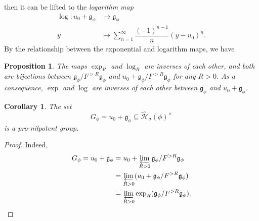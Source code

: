\documentclass[a4paper,12pt]{amsart}
\numberwithin{equation}{section}
\newtheorem{proposition}[theorem]{Proposition}
\newtheorem{corollary}[theorem]{Corollary}
\newcommand{\1}{\mathbf{1}}
\begin{document}
then it can be lifted to the \emph{logarithm map}
\begin{align*}
    \log:u_0+\mathfrak{g}_\phi&\rightarrow \mathfrak{g}_\phi\\
        y&\mapsto\sum_{n=1}^\infty\dfrac{(-1)^{n-1}}{n}(y-u_0)^n.
\end{align*}
By the relationship between the exponential and logarithm maps, we have
\begin{proposition}
    The maps $\exp_R$ and $\log_R$ are inverses of each other, and both are bijections between $\mathfrak{g}_\phi/F^{>R}\mathfrak{g}_\phi$ and $u_0+\mathfrak{g}_\phi/F^{>R}\mathfrak{g}_\phi$ for any $R>0$. As a consequence, $\exp$ and $\log$ are inverses of each other between $\mathfrak{g}_\phi$ and $u_0+\mathfrak{g}_\phi$.
\end{proposition}
\begin{corollary}
    The set
    \[G_\phi=u_0+\mathfrak{g}_\phi\subseteq\hat{\mathcal{H}}_\sigma(\phi)^\times\]
    is a pro-nilpotent group.
\end{corollary}
\begin{proof}
    Indeed,
    \begin{align*}
        G_\phi=u_0+\mathfrak{g}_\phi&=u_0+\varprojlim_{R>0}\mathfrak{g}_\phi/F^{>R}\mathfrak{g}_\phi\\
        &=\varprojlim_{R>0}(u_0+\mathfrak{g}_\phi/F^{>R}\mathfrak{g}_\phi)\\
        &=\varprojlim_{R>0}\exp_R(\mathfrak{g}_\phi/F^{>R}\mathfrak{g}_\phi).
    \end{align*}
\end{proof}
\end{document}
